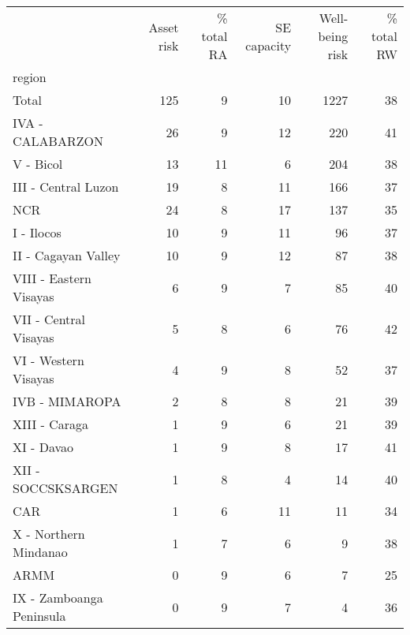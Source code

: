 \begin{tabular}{lrrrrr}
\toprule
{} &  Asset risk &  \% total RA &  SE capacity &  Well-being risk &  \% total RW \\
region                   &             &             &              &                  &             \\
\midrule
Total                    &         125 &           9 &           10 &             1227 &          38 \\
IVA - CALABARZON         &          26 &           9 &           12 &              220 &          41 \\
V - Bicol                &          13 &          11 &            6 &              204 &          38 \\
III - Central Luzon      &          19 &           8 &           11 &              166 &          37 \\
NCR                      &          24 &           8 &           17 &              137 &          35 \\
I - Ilocos               &          10 &           9 &           11 &               96 &          37 \\
II - Cagayan Valley      &          10 &           9 &           12 &               87 &          38 \\
VIII - Eastern Visayas   &           6 &           9 &            7 &               85 &          40 \\
VII - Central Visayas    &           5 &           8 &            6 &               76 &          42 \\
VI - Western Visayas     &           4 &           9 &            8 &               52 &          37 \\
IVB - MIMAROPA           &           2 &           8 &            8 &               21 &          39 \\
XIII - Caraga            &           1 &           9 &            6 &               21 &          39 \\
XI - Davao               &           1 &           9 &            8 &               17 &          41 \\
XII - SOCCSKSARGEN       &           1 &           8 &            4 &               14 &          40 \\
CAR                      &           1 &           6 &           11 &               11 &          34 \\
X - Northern Mindanao    &           1 &           7 &            6 &                9 &          38 \\
ARMM                     &           0 &           9 &            6 &                7 &          25 \\
IX - Zamboanga Peninsula &           0 &           9 &            7 &                4 &          36 \\
\bottomrule
\end{tabular}
